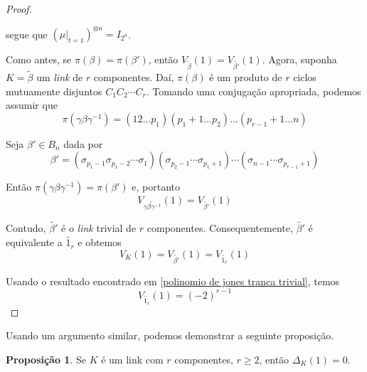 \documentclass[a4paper,portuguese,11pt,twoside, leqno]{book}
\theoremstyle{definition}
\newtheorem{prop}{Proposição}[section]
\begin{document}
\begin{proof}
\begin{equation*}
		\end{equation*}
		\par\vspace{0.3cm} segue que $(\mu|_{t=1})^{\otimes n} = I_{2^n}$.
		\par\vspace{0.3cm} Como antes, se $\pi(\beta) = \pi(\beta')$, então $V_{\widetilde{\beta}}(1) = V_{\widetilde{\beta'}}(1)$. Agora, suponha $K = \widetilde{\beta}$ um \textit{link} de $r$ componentes. Daí, $\pi(\beta)$ é um produto de $r$ ciclos mutuamente disjuntos  $C_1C_2\cdots C_r$. Tomando uma conjugação apropriada, podemos assumir que 
		\begin{equation*}
		\pi(\gamma\beta\gamma^{-1}) = (12\dots p_1)(p_1+1\dots p_2)\dots(p_{r-1}+1\dots n)
		\end{equation*}
		\par\vspace{0.3cm} Seja $\beta'\in B_n$ dada por
		\begin{equation*}
		\beta' = (\sigma_{p_1-1}\sigma_{p_1-2}\cdots\sigma_1)(\sigma_{p_2-1}\cdots\sigma_{p_1+1})\cdots( \sigma_{n-1}\cdots\sigma_{p_{r-1} + 1} )
		\end{equation*}
		\par\vspace{0.3cm} Então $\pi(\gamma\beta\gamma^{-1}) = \pi(\beta')$ e, portanto
		\begin{equation*}
		V_{\widetilde{\gamma\beta\gamma^{-1}}}(1) = V_{ \widetilde{\beta'} }(1)
		\end{equation*}
		\par\vspace{0.3cm} Contudo, $\widetilde{\beta'}$ é o \textit{link} trivial de $r$ componentes. Consequentemente, $\widetilde{\beta'}$ é equivalente a $\widetilde{1_r}$ e obtemos
		\begin{equation*}
		V_K(1) = V_{\widetilde{\beta'}}(1) = V_{\widetilde{1_r}}(1)
		\end{equation*}
		\par\vspace{0.3cm} Usando o resultado encontrado em \eqref{polinomio de jones tranca trivial}, temos
		\begin{equation*}
		V_{\widetilde{1_r}}(1) = (-2)^{r-1}
		\end{equation*}
	\end{proof}
	\par\vspace{0.3cm} Usando um argumento similar, podemos demonstrar a seguinte proposição.
	\begin{prop}
		\label{polinomio de Alexander para links}
		Se $K$ é um link com $r$ componentes, $r\geq 2$, então $\Delta_K(1) = 0$.
	\end{prop}
\end{document}
